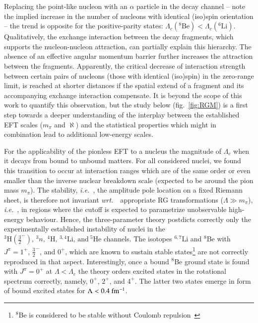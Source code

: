 \documentclass[preprint,12pt]{elsarticle}
\newcommand{\lc}{\ensuremath{\Lambda_c}}
\newcommand{\wrt}{\textit{wrt.}~}
\newcommand{\ie}{\textit{i.e.}~}
\begin{document}
Replacing the point-like nucleon with an $\alpha$ particle
in the decay channel -- note the implied increase in the number of nucleons with identical (iso)spin orientation -- the trend is opposite
for the positive-parity states: $\lc(^8\text{Be})<\lc(^6\text{Li})$.
Qualitatively, the exchange interaction between the decay fragments, which supports the nucleon-nucleon attraction,
can partially explain this hierarchy. The absence of an
effective angular momentum barrier further increases the attraction between the fragments. Apparently, the critical decrease
of interaction strength between certain pairs of nucleons (those with identical (iso)spin) in the zero-range limit, is reached
at shorter distances if the spatial extend of a fragment and its accompanying exchange interaction compensate.
It is beyond the scope of this work to quantify this observation, but the study below (fig.~\ref{fig:RGM}) is a first step
towards a deeper understanding of the interplay between the established EFT scales ($m_\pi$ and $\aleph$) and the statistical
properties which might in combination lead to additional low-energy scales. 

%
For the applicability of the pionless EFT to a nucleus the magnitude of $\lc$ when it decays from
bound to unbound matters. For all considered nuclei, we found this transition to occur at interaction ranges which are of the
same order or even smaller than the inverse nuclear breakdown scale (expected to be around the pion mass $m_\pi$).
The stability, \ie, the amplitude pole location on a fixed Riemann sheet, is therefore not invariant \wrt~appropriate RG transformations
($\Lambda\gg m_\pi$), \ie, in regions where the cutoff is expected to parametrize unobservable high-energy behaviour.
Hence, the three-parameter theory postdicts correctly only the experimentally established instability of nuclei in the
$^3\text{H}(\frac{3}{2}^-),\,^3n,\,^4\text{H},\,^{3,4}\text{Li},\,\text{and}~^5\text{He}$ channels.
The isotopes $^{6,7}\text{Li}$ and $^8$Be with $J^\pi=1^+$, $\frac{3}{2}^-$, and $0^+$, which are known to sustain stable
states\footnote{$^8$Be is considered to be stable without Coulomb repulsion~\cite{AFZAL:1969zz,Higa:2008dn}}
are not correctly reproduced in that aspect.
%
Interestingly, once a bound $^8$Be ground state is found with $J^\pi=0^+$ at $\Lambda<\lc$ the theory orders excited states in the
rotational spectrum correctly, namely, $0^+$, $2^+$, and $4^+$. 
The latter two states emerge in form of bound excited states for $\Lambda<0.4~{\rm fm^{-1}}$.
\end{document}

